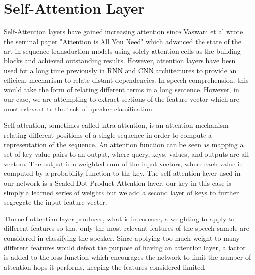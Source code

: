 \section{Self-Attention Layer}
\label{cha:methods/self-attention layer}

Self-Attention layers have gained increasing attention since Vaswani et al wrote the seminal paper "Attention is All You Need" which advanced the state of the art in sequence transduction models using solely attention cells as the building blocks and achieved outstanding results. However, attention layers have been used for a long time previously in RNN and CNN architectures to provide an efficient mechanism to relate distant dependencies. In speech comprehension, this would take the form of relating different terms in a long sentence. However, in our case, we are attempting to extract sections of the feature vector which are most relevant to the task of speaker classification.

Self-attention, sometimes called intra-attention, is an attention mechanism relating different positions of a single sequence in order to compute a representation of the sequence. An attention function can be seen as mapping a set of key-value pairs to an output, where query, keys, values, and outputs are all vectors. The output is a weighted sum of the input vectors, where each value is computed by a probability function to the key. The self-attention layer used in our network is a Scaled Dot-Product Attention layer, our key in this case is simply a learned series of weights but we add a second layer of keys to further segregate the input feature vector. 

The self-attention layer produces, what is in essence, a weighting to apply to different features so that only the most relevant features of the speech sample are considered in classifying the speaker. Since applying too much weight to many different features would defeat the purpose of having an attention layer, a factor is added to the loss function which encourages the network to limit the number of attention hops it performs, keeping the features considered limited.
